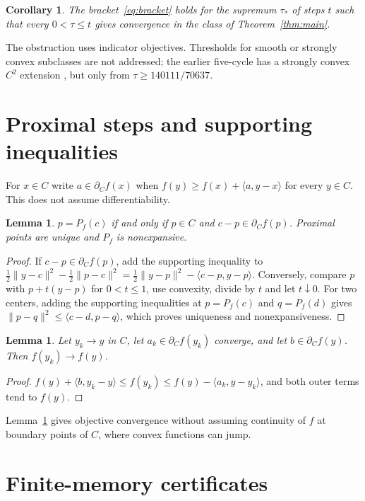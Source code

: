 \documentclass[11pt]{article}
\numberwithin{equation}{section}
\newtheorem{lemma}[theorem]{Lemma}
\newtheorem{corollary}[theorem]{Corollary}
\theoremstyle{definition}
\theoremstyle{remark}
\newcommand{\ip}[2]{\langle #1,#2\rangle}
\newcommand{\norm}[1]{\lVert #1\rVert}
\begin{document}
\begin{corollary}
The bracket~\eqref{eq:bracket} holds for the supremum $\tau_*$ of steps $t$ such that every $0<\tau\le t$ gives convergence in the class of Theorem~\ref{thm:main}.
\end{corollary}

The obstruction uses indicator objectives. Thresholds for smooth or strongly convex subclasses are not addressed; the earlier five-cycle has a strongly convex $C^2$ extension \cite{FiveCycle}, but only from $\tau\ge140111/70637$.

\section{Proximal steps and supporting inequalities}\label{sec:prox}
For $x\in C$ write $a\in\partial_Cf(x)$ when $f(y)\ge f(x)+\ip{a}{y-x}$ for every $y\in C$. This does not assume differentiability.

\begin{lemma}\label{lem:prox}
$p=P_f(c)$ if and only if $p\in C$ and $c-p\in\partial_Cf(p)$. Proximal points are unique and $P_f$ is nonexpansive.
\end{lemma}
\begin{proof}
If $c-p\in\partial_Cf(p)$, add the supporting inequality to $\tfrac12\norm{y-c}^2-\tfrac12\norm{p-c}^2=\tfrac12\norm{y-p}^2-\ip{c-p}{y-p}$. Conversely, compare $p$ with $p+t(y-p)$ for $0<t\le1$, use convexity, divide by $t$ and let $t\downarrow0$. For two centers, adding the supporting inequalities at $p=P_f(c)$ and $q=P_f(d)$ gives $\norm{p-q}^2\le\ip{c-d}{p-q}$, which proves uniqueness and nonexpansiveness.
\end{proof}

\begin{lemma}\label{lem:sandwich}
Let $y_k\to y$ in $C$, let $a_k\in\partial_Cf(y_k)$ converge, and let $b\in\partial_Cf(y)$. Then $f(y_k)\to f(y)$.
\end{lemma}
\begin{proof}
$f(y)+\ip{b}{y_k-y}\le f(y_k)\le f(y)-\ip{a_k}{y-y_k}$, and both outer terms tend to $f(y)$.
\end{proof}
Lemma~\ref{lem:sandwich} gives objective convergence without assuming continuity of $f$ at boundary points of $C$, where convex functions can jump.

\section{Finite-memory certificates}\label{sec:certificates}
\end{document}
